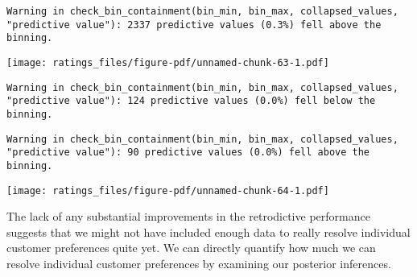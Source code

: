 \documentclass[
  letterpaper,
  DIV=11,
  numbers=noendperiod]{scrartcl}
\newenvironment{Shaded}{\begin{snugshade}}{\end{snugshade}}
\newcommand{\AttributeTok}[1]{\textcolor[rgb]{0.40,0.45,0.13}{#1}}
\newcommand{\DecValTok}[1]{\textcolor[rgb]{0.68,0.00,0.00}{#1}}
\newcommand{\FloatTok}[1]{\textcolor[rgb]{0.68,0.00,0.00}{#1}}
\newcommand{\FunctionTok}[1]{\textcolor[rgb]{0.28,0.35,0.67}{#1}}
\newcommand{\NormalTok}[1]{\textcolor[rgb]{0.00,0.23,0.31}{#1}}
\newcommand{\OtherTok}[1]{\textcolor[rgb]{0.00,0.23,0.31}{#1}}
\newcommand{\SpecialCharTok}[1]{\textcolor[rgb]{0.37,0.37,0.37}{#1}}
\newcommand{\StringTok}[1]{\textcolor[rgb]{0.13,0.47,0.30}{#1}}
\begin{document}
\begin{verbatim}
Warning in check_bin_containment(bin_min, bin_max, collapsed_values,
"predictive value"): 2337 predictive values (0.3%) fell above the binning.
\end{verbatim}

\texttt{[image: ratings\_files/figure-pdf/unnamed-chunk-63-1.pdf]}

\begin{Shaded}
\end{Shaded}

\begin{verbatim}
Warning in check_bin_containment(bin_min, bin_max, collapsed_values,
"predictive value"): 124 predictive values (0.0%) fell below the binning.
\end{verbatim}

\begin{verbatim}
Warning in check_bin_containment(bin_min, bin_max, collapsed_values,
"predictive value"): 90 predictive values (0.0%) fell above the binning.
\end{verbatim}

\texttt{[image: ratings\_files/figure-pdf/unnamed-chunk-64-1.pdf]}

The lack of any substantial improvements in the retrodictive performance
suggests that we might not have included enough data to really resolve
individual customer preferences quite yet. We can directly quantify how
much we can resolve individual customer preferences by examining our
posterior inferences.
\end{document}
